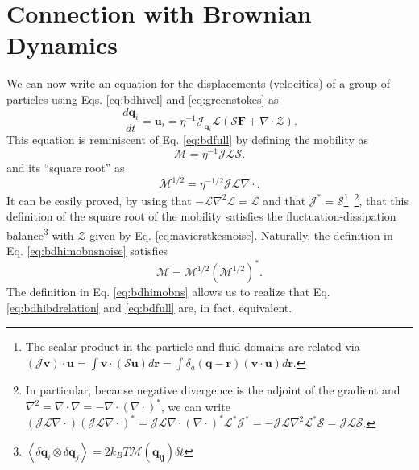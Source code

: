 \documentclass[twoside,openright,titlepage,numbers=noenddot,%
headinclude,footinclude,cleardoublepage=empty,abstract=on,
BCOR=5mm,fontsize=11pt, dvipsnames, paper=b5
]{scrreprt}
\renewcommand{\vec}[1]{\bm{#1}}
\newcommand{\tens}[1]{\bm{\mathcal{#1}}}
\newcommand{\oper}[1]{\mathcal{#1}}
\newcommand{\dt}{\delta t}
\newcommand{\kT}{k_B T}
\newcommand{\ppos}{q}
\newcommand{\pvel}{u}
\newcommand{\fpos}{r}
\newcommand{\fvel}{v}
\begin{document}
\section{Connection with Brownian Dynamics}\label{sec:bdhicon}

We can now write an equation for the displacements (velocities) of a group of particles using Eqs. \eqref{eq:bdhivel} and \eqref{eq:greenstokes} as
\begin{equation}
  \label{eq:bdhibdrelation}
  \frac{d\vec{q}_i}{dt} = \vec{u}_i = \eta^{-1}\oper{J}_{\vec{\ppos}_i}\oper{L}(\oper{S}\vec{F} + \nabla\cdot\mathcal Z).
\end{equation}
This equation is reminiscent of Eq. \eqref{eq:bdfull} by defining the mobility as
\begin{equation}
  \label{eq:bdhimobns}
  \tens{M} = \eta^{-1}\oper{J}\oper{L}\oper{S}.
\end{equation}
and its ``square root'' as
\begin{equation}
  \label{eq:bdhimobnsnoise}
  \tens{M}^{1/2} = \eta^{-1/2}\oper{J}\oper{L}\nabla\cdot.
\end{equation}
It can be easily proved, by using that $-\oper{L}\nabla^2\oper{L} = \oper{L}$ and that $\oper{J}^*=\oper{S}$\footnote{The scalar product in the particle and fluid domains are related via $(\oper{J}\vec{\fvel})\cdot\vec{\pvel} = \int{\vec{\fvel}\cdot(\oper{S}\vec{\pvel})d\vec{r}} = \int{\delta_a(\vec{\ppos}-\vec{\fpos})(\vec{\fvel}\cdot\vec{\pvel})d\vec{r}}$.}~\cite{Delong2014}\footnote{In particular, because negative divergence is the adjoint of the gradient and $\nabla^2 = \nabla\cdot\nabla = -\nabla\cdot(\nabla\cdot)^*$, we can write $\left(\oper{J}\oper{L}\nabla\cdot\right)\left(\oper{J}\oper{L}\nabla\cdot\right)^* = \oper{J}\oper{L}\nabla\cdot(\nabla\cdot)^*\oper{L}^*\oper{J}^* = -\oper{J}\oper{L}\nabla^2\oper{L}^*\oper{S} = \oper{J}\oper{L}\oper{S}$.}, that this definition of the square root of the mobility satisfies the fluctuation-dissipation balance\footnote{$\left\langle\delta\vec{\ppos}_i\otimes\delta\vec{\ppos}_j\right\rangle = 2\kT\tens{M}(\vec{\ppos_{ij}})\dt$} with $\mathcal{Z}$ given by Eq. \eqref{eq:navierstkesnoise}.
Naturally, the definition in Eq. \eqref{eq:bdhimobnsnoise} satisfies
\begin{equation}
  \label{eq:mobsqrt}
  \tens{M} = \tens{M}^{1/2}\left(\tens{M}^{1/2}\right)^*.
\end{equation}
The definition in Eq. \ref{eq:bdhimobns} allows us to realize that Eq. \eqref{eq:bdhibdrelation} and \eqref{eq:bdfull} are, in fact, equivalent.
\end{document}

